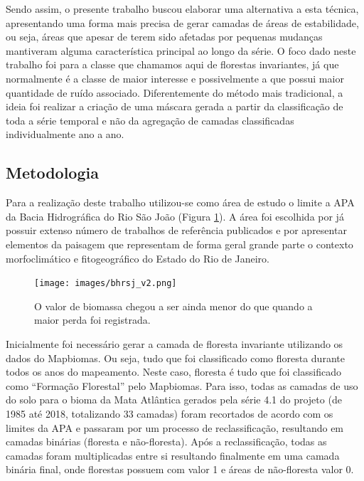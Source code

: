 \documentclass[12pt,a4paper]{article}
\begin{document}
Sendo assim, o presente trabalho buscou elaborar uma alternativa a esta técnica, apresentando uma forma mais precisa de gerar camadas de áreas de estabilidade, ou seja, áreas que apesar de terem sido afetadas por pequenas mudanças mantiveram alguma característica principal ao longo da série. O foco dado neste trabalho foi para a classe que chamamos aqui de florestas invariantes, já que normalmente é a classe de maior interesse e possivelmente a que possui maior quantidade de ruído associado. Diferentemente do método mais tradicional, a ideia foi realizar a criação de uma máscara gerada a partir da classificação de toda a série temporal e não da agregação de camadas classificadas individualmente ano a ano. 

\subsection{Metodologia}

\hspace{13pt} Para a realização deste trabalho utilizou-se como área de estudo o limite a APA da Bacia Hidrográfica do Rio São João (Figura \ref{fig:bhrsj}). A área foi escolhida por já possuir extenso número de trabalhos de referência publicados e por apresentar elementos da paisagem que representam de forma geral grande parte o contexto morfoclimático e fitogeográfico do Estado do Rio de Janeiro.

\begin{figure}[h!]
    \centering
    \texttt{[image: images/bhrsj\_v2.png]}
    \caption{O valor de biomassa chegou a ser ainda menor do que quando a maior perda foi registrada.}
    \label{fig:bhrsj}
\end{figure}

Inicialmente foi necessário gerar a camada de floresta invariante utilizando os dados do Mapbiomas. Ou seja, tudo que foi classificado como floresta durante todos os anos do mapeamento. Neste caso, floresta é tudo que foi classificado como “Formação Florestal” pelo Mapbiomas. Para isso, todas as camadas de uso do solo para o bioma da Mata Atlântica gerados pela série 4.1 do projeto (de 1985 até 2018, totalizando 33 camadas) foram recortados de acordo com os limites da APA e passaram por um processo de reclassificação, resultando em camadas binárias (floresta e não-floresta). Após a reclassificação, todas as camadas foram multiplicadas entre si resultando finalmente em uma camada binária final, onde florestas possuem com valor 1 e áreas de não-floresta valor 0.
\end{document}
